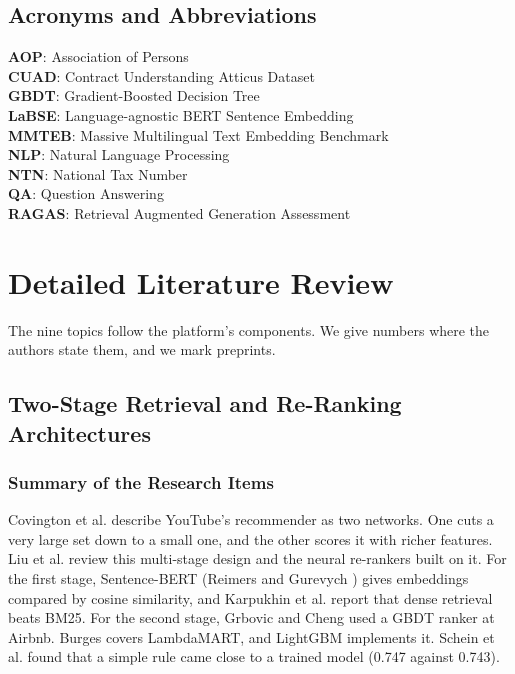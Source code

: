 \documentclass{FastFyp}
\begin{document}
\subsection{Acronyms and Abbreviations}
\textbf{AOP}: Association of Persons\\
\textbf{CUAD}: Contract Understanding Atticus Dataset\\
\textbf{GBDT}: Gradient-Boosted Decision Tree\\
\textbf{LaBSE}: Language-agnostic BERT Sentence Embedding\\
\textbf{MMTEB}: Massive Multilingual Text Embedding Benchmark\\
\textbf{NLP}: Natural Language Processing\\
\textbf{NTN}: National Tax Number\\
\textbf{QA}: Question Answering\\
\textbf{RAGAS}: Retrieval Augmented Generation Assessment

\section{Detailed Literature Review}
The nine topics follow the platform's components. We give numbers where the authors state them, and we mark preprints.

\subsection{Two-Stage Retrieval and Re-Ranking Architectures}\label{sec:lr-retrieval}

\subsubsection{Summary of the Research Items}
Covington et al. \cite{ref:covington2016} describe YouTube's recommender as two networks. One cuts a very large set down to a small one, and the other scores it with richer features. Liu et al. \cite{ref:liu2022rerank} review this multi-stage design and the neural re-rankers built on it. For the first stage, Sentence-BERT (Reimers and Gurevych \cite{ref:reimers2019}) gives embeddings compared by cosine similarity, and Karpukhin et al. \cite{ref:karpukhin2020} report that dense retrieval beats BM25. For the second stage, Grbovic and Cheng \cite{ref:grbovic2018} used a GBDT ranker at Airbnb. Burges \cite{ref:burges2010} covers LambdaMART, and LightGBM \cite{ref:ke2017} implements it. Schein et al. \cite{ref:schein2002} found that a simple rule came close to a trained model (0.747 against 0.743).
\end{document}
